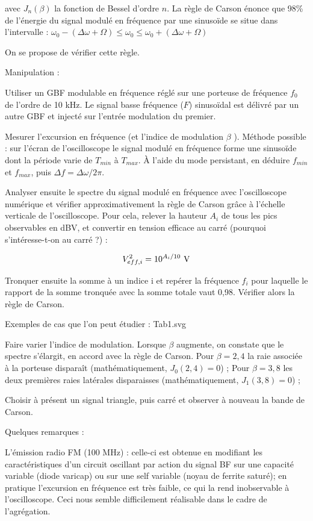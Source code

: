 \documentclass{article}%
\begin{document}
avec $\textstyle J_n(\beta)$ la fonction de Bessel d'ordre $ n$. La règle de Carson énonce que 98\% de l’énergie du signal modulé en fréquence par une sinusoïde se situe dans l’intervalle :
$\omega _{0} - (\Delta \omega + \Omega) \le \omega_0 \le \omega_0 + (\Delta \omega + \Omega)$

On se propose de vérifier cette règle.

Manipulation :

Utiliser un GBF modulable en fréquence réglé sur une porteuse de fréquence $f_{0}$ de l'ordre de 10 kHz. Le signal basse fréquence ($F$) sinusoïdal est délivré par un autre GBF et injecté sur l'entrée modulation du premier.

    Mesurer l'excursion en fréquence (et l'indice de modulation $\beta$ ). Méthode possible : sur l'écran de l'oscilloscope le signal modulé en fréquence forme une sinusoïde dont la période varie de $T_{min}$ à $T_{max}$. À l'aide du mode persistant, en déduire $f_{min}$ et $f_{max}$, puis $\Delta f=\Delta\omega/2\pi$.

    Analyser ensuite le spectre du signal modulé en fréquence avec l'oscilloscope numérique et vérifier approximativement la règle de Carson grâce à l'échelle verticale de l'oscilloscope. Pour cela, relever la hauteur $A_i$ de tous les pics observables en dBV, et convertir en tension efficace au carré (pourquoi s'intéresse-t-on au carré ?) :

\[ V_{eff,i}^2 = 10^{A_i/10} \ \rm V\]

Tronquer ensuite la somme à un indice i et repérer la fréquence $f_i$ pour laquelle le rapport de la somme tronquée avec la somme totale vaut 0,98. Vérifier alors la règle de Carson.

Exemples de cas que l'on peut étudier :
Tab1.svg

    Faire varier l'indice de modulation. Lorsque $\beta$ augmente, on constate que le spectre s'élargit, en accord avec la règle de Carson.
        Pour $\beta = 2,4$ la raie associée à la porteuse disparaît (mathématiquement, $J_0(2,4) = 0$) ;
        Pour $\beta = 3,8$ les deux premières raies latérales disparaisses (mathématiquement, $J_1(3,8) = 0$) ;

    Choisir à présent un signal triangle, puis carré et observer à nouveau la bande de Carson.


Quelques remarques :

L'émission radio FM (100 MHz) : celle-ci est obtenue en modifiant les caractéristiques d'un circuit oscillant par action du signal BF sur une capacité variable (diode varicap) ou sur une self variable (noyau de ferrite saturé); en pratique l'excursion en fréquence est très faible, ce qui la rend inobservable à l'oscilloscope. Ceci nous semble difficilement réalisable dans le cadre de l'agrégation.
\end{document}
